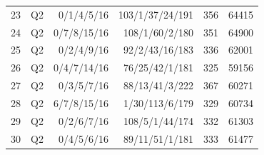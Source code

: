 \begin{longtable}{rrrrrr}
23 & Q2 & 0/1/4/5/16 & 103/1/37/24/191 & 356 & 64415\\
24 & Q2 & 0/7/8/15/16 & 108/1/60/2/180 & 351 & 64900\\
25 & Q2 & 0/2/4/9/16 & 92/2/43/16/183 & 336 & 62001\\
26 & Q2 & 0/4/7/14/16 & 76/25/42/1/181 & 325 & 59156\\
27 & Q2 & 0/3/5/7/16 & 88/13/41/3/222 & 367 & 60271\\
28 & Q2 & 6/7/8/15/16 & 1/30/113/6/179 & 329 & 60734\\
29 & Q2 & 0/2/6/7/16 & 108/5/1/44/174 & 332 & 61303\\
30 & Q2 & 0/4/5/6/16 & 89/11/51/1/181 & 333 & 61477\\
\bottomrule
\end{longtable}